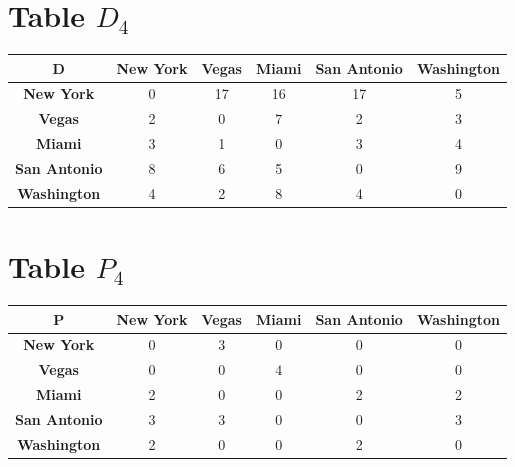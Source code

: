 \documentclass{article}
\begin{document}
\section{Table $D_{4}$}
\begin{center}
    \begin{tabular}{|c||c|c|c|c|c|}
        \hline
        \textbf{D} & \textbf{New York} & \textbf{Vegas} & \textbf{Miami} & \textbf{San Antonio} & \textbf{Washington} \\
        \hline
        \hline
        \textbf{New York}& 0 & 17 & 16 & 17 & 5 \\
        \hline
        \textbf{Vegas}& 2 & 0 & \cellcolor[HTML]{D74894}$7$ & 2 & 3 \\
        \hline
        \textbf{Miami}& 3 & 1 & 0 & 3 & 4 \\
        \hline
        \textbf{San Antonio}& 8 & 6 & 5 & 0 & 9 \\
        \hline
        \textbf{Washington}& 4 & 2 & 8 & 4 & 0 \\
        \hline
    \end{tabular}
\end{center}


\section{Table $P_{4}$}
\begin{center}
    \begin{tabular}{|c||c|c|c|c|c|}
        \hline
        \textbf{P} & \textbf{New York} & \textbf{Vegas} & \textbf{Miami} & \textbf{San Antonio} & \textbf{Washington} \\
        \hline
        \hline
        \textbf{New York}& 0 & 3 & 0 & 0 & 0 \\
        \hline
        \textbf{Vegas}& 0 & 0 & \cellcolor[HTML]{D74894}$4$ & 0 & 0 \\
        \hline
        \textbf{Miami}& 2 & 0 & 0 & 2 & 2 \\
        \hline
        \textbf{San Antonio}& 3 & 3 & 0 & 0 & 3 \\
        \hline
        \textbf{Washington}& 2 & 0 & 0 & 2 & 0 \\
        \hline
    \end{tabular}
\end{center}
\end{document}
